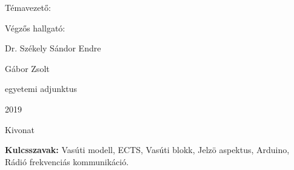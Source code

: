\documentclass[a4paper,12pt]{article}
\begin{document}
	\begin{multicols}{2}
		\begin{flushleft}
			{\Large Témavezető:}
		\end{flushleft}
		\columnbreak
		\begin{flushright}
			{\Large Végzős hallgató:}
		\end{flushright}
	\end{multicols}
	\begin{multicols}{2}
		\begin{flushleft}
			{\LARGE Dr. Székely Sándor Endre}
		\end{flushleft}
		\columnbreak
		\begin{flushright}
			{\LARGE Gábor Zsolt}
		\end{flushright}
	\end{multicols}
	\begin{flushleft}
		{\Large egyetemi adjunktus}
	\end{flushleft}
	\vspace{1.2 in}
		
	\begin{center}
		{\LARGE 2019}
	\end{center}
\newpage
\pagestyle{empty}
\begin{center}
    {\LARGE Kivonat}
\end{center}
\textbf{Kulcsszavak:} Vasúti modell, ECTS, Vasúti blokk, Jelzö aspektus, Arduino, Rádió frekvenciás kommunikáció.
\end{document}
